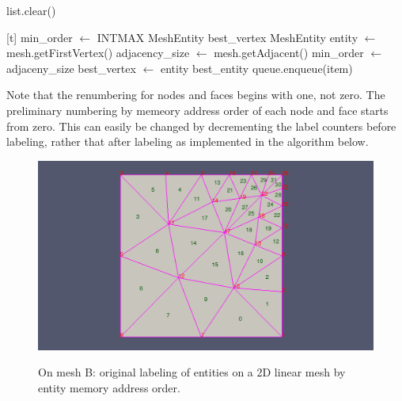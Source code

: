 \documentclass{article}
\begin{document}
\begin{algorithm}
\begin{algorithmic}

            \State {}
            \State list.clear()

        \EndIf

    \EndWhile
\EndProcedure
\State
{}[t]
    \State{}
    \State min\_order $\gets$ INTMAX
    \State MeshEntity best\_vertex
    \State MeshEntity entity $\gets$ mesh.getFirstVertex()
            \State adjacency\_size $\gets$ mesh.getAdjacent()
                \State min\_order $\gets$ adjaceny\_size
                \State best\_vertex $\gets$ entity
            \EndIf
        \EndIf
    \EndWhile
    \State\Return best\_entity
\EndProcedure
\State
{}
            \State queue.enqueue(item)
        \EndIf
    \EndFor
\EndProcedure

\end{algorithmic}
\end{algorithm}

Note that the renumbering for nodes and faces begins with one, not zero. The preliminary numbering by memeory address order of each node and face starts from zero. This can easily be changed by decrementing the label counters before labeling, rather that after labeling as implemented in the algorithm below.

\FloatBarrier
\restoregeometry


\begin{figure}[ht]
\caption{On mesh B: original labeling of entities on a 2D linear mesh by entity memory address order.}
{\includegraphics[width = 15cm ]{pre_b}}
\centering
\end{figure}
\end{document}
